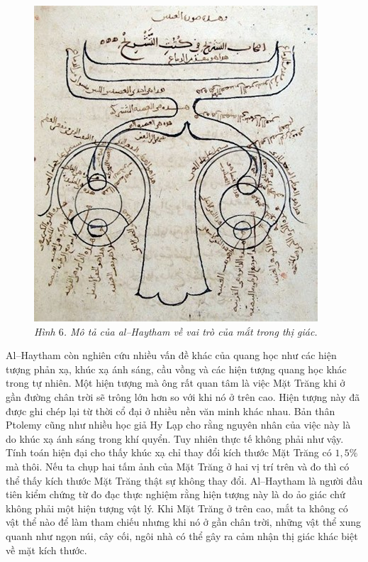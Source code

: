 \begin{multicols}{2}
	\begin{figure}[H]
		\vspace*{-5pt}
		\centering
		\captionsetup{labelformat= empty, justification=centering}
		\includegraphics[width= 1\linewidth]{7}
		\caption{\small\textit{\color{lichsutoanhoc}Hình $6$. Mô tả của al--Haytham về vai trò của mắt trong thị giác.}}
		\vspace*{-10pt}
	\end{figure}
	Al--Haytham còn nghiên cứu nhiều vấn đề khác của quang học như các hiện tượng phản xạ, khúc xạ ánh sáng, cầu vồng và các hiện tượng quang học khác trong tự nhiên. Một hiện tượng mà ông rất quan tâm là việc Mặt Trăng khi ở gần đường chân trời sẽ trông lớn hơn so với khi nó ở trên cao. Hiện tượng này đã được ghi chép lại từ thời cổ đại ở nhiều nền văn minh khác nhau. Bản thân Ptolemy cũng như nhiều học giả Hy Lạp cho rằng nguyên nhân của việc này là do khúc xạ ánh sáng trong khí quyển. Tuy nhiên thực tế không phải như vậy. Tính toán hiện đại cho thấy khúc xạ chỉ thay đổi kích thước Mặt Trăng có $1,5\%$ mà thôi. Nếu ta chụp hai tấm ảnh của Mặt Trăng ở hai vị trí trên và đo thì có thể thấy kích thước Mặt Trăng thật sự không thay đổi. Al--Haytham là người đầu tiên kiểm chứng từ đo đạc thực nghiệm rằng hiện tượng này là do ảo giác chứ không phải một hiện tượng vật lý. Khi Mặt Trăng ở trên cao, mắt ta không có vật thể nào để làm tham chiếu nhưng khi nó ở gần chân trời, những vật thể xung quanh như ngọn núi, cây cối, ngôi nhà có thể gây ra cảm nhận thị giác khác biệt về mặt kích thước.

\end{multicols}

